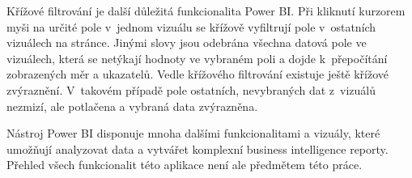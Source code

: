 Křížové filtrování je další důležitá funkcionalita Power BI. Při kliknutí kurzorem myši na určité pole v~jednom vizuálu se křížově vyfiltrují pole v~ostatních vizuálech na stránce. Jinými slovy jsou odebrána všechna datová pole ve vizuálech, která se netýkají hodnoty ve vybraném poli a dojde k~přepočítání zobrazených měr a ukazatelů. Vedle křížového filtrování existuje ještě křížové zvýraznění. V~takovém případě pole ostatních, nevybraných dat z~vizuálů nezmizí, ale potlačena a vybraná data zvýrazněna. 

Nástroj Power BI disponuje mnoha dalšími funkcionalitami a vizuály, které umožňují analyzovat data a  vytvářet komplexní business intelligence reporty. Přehled všech funkcionalit této aplikace není ale předmětem této práce.











